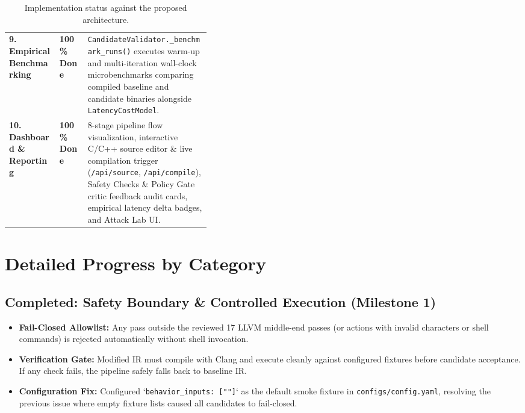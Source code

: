 \documentclass[11pt]{article}
\begin{document}
\begin{table}[h]
\begin{tabularx}{\linewidth}{@{}p{0.25\linewidth}p{0.14\linewidth}Y@{}}
\textbf{9. Empirical Benchmarking} & \textbf{100\% Done} & \texttt{CandidateValidator.\_benchmark\_runs()} executes warm-up and multi-iteration wall-clock microbenchmarks comparing compiled baseline and candidate binaries alongside \texttt{LatencyCostModel}. \\
\textbf{10. Dashboard \& Reporting} & \textbf{100\% Done} & 8-stage pipeline flow visualization, interactive C/C++ source editor \& live compilation trigger (\texttt{/api/source}, \texttt{/api/compile}), Safety Checks \& Policy Gate critic feedback audit cards, empirical latency delta badges, and Attack Lab UI. \\
\bottomrule
\end{tabularx}
\caption{Implementation status against the proposed architecture.}
\end{table}

\section{Detailed Progress by Category}

\subsection{Completed: Safety Boundary \& Controlled Execution (Milestone 1)}
\begin{itemize}
  \item \textbf{Fail-Closed Allowlist:} Any pass outside the reviewed 17 LLVM middle-end passes (or actions with invalid characters or shell commands) is rejected automatically without shell invocation.
  \item \textbf{Verification Gate:} Modified IR must compile with Clang and execute cleanly against configured fixtures before candidate acceptance. If any check fails, the pipeline safely falls back to baseline IR.
  \item \textbf{Configuration Fix:} Configured `\texttt{behavior\_inputs: [""]}` as the default smoke fixture in \texttt{configs/config.yaml}, resolving the previous issue where empty fixture lists caused all candidates to fail-closed.
\end{itemize}
\end{document}

